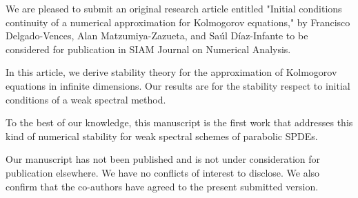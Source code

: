 \documentclass[10pt ,stdletter, dateno, sigleft]{newlfm}
\begin{document}
    \begin{newlfm}
    
             We are pleased to submit an original research article entitled
        "Initial conditions continuity of a numerical approximation for 
        Kolmogorov equations," by Francisco Delgado-Vences, Alan 
        Matzumiya-Zazueta, and Sa\'ul D\'iaz-Infante to be considered for 
        publication in SIAM Journal on Numerical Analysis.

            In this article, we derive stability theory for the
        approximation of Kolmogorov equations in infinite dimensions. Our
        results are for the stability respect to initial conditions of a weak
        spectral method.

            To the best of our knowledge, this manuscript is the first work 
        that addresses this kind of numerical stability for weak spectral 
        schemes of parabolic SPDEs.
    
            Our manuscript has not been published and is not under consideration
        for publication elsewhere. We have no conflicts of interest to disclose.
        We also confirm that the co-authors have agreed to the present 
        submitted version.
        \\[0.25cm]
\end{newlfm}
\end{document}
